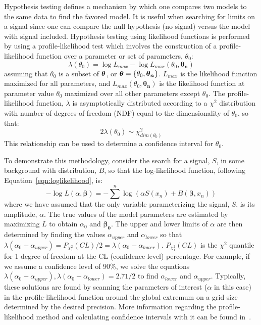 Hypothesis testing defines a mechanism by which one compares two models to the same data to find the favored model.  It is useful when searching for limits on a signal since one can compare the null hypothesis (no signal) versus the model with signal included.  Hypothesis testing using likelihood functions is performed by using a profile-likelihood test which involves the construction of a profile-likelihood function over a parameter or set of parameters, $\theta_{0}$:
		\begin{equation}
		\lambda(\theta_{0}) = \log L_{max}  - \log L_{max}(\theta_{0}, \boldsymbol{\theta_{n}})
		\end{equation}
assuming that $\theta_{0}$ is a subset of $\boldsymbol{\theta}$, or $\boldsymbol{\theta} = \{\theta_{0}, \boldsymbol{\theta_{n}}\}$.  $L_{max}$ is the likelihood function maximized for all parameters, and $ L_{max}(\theta_{0}, \boldsymbol{\theta_{n}})$ is the likelihood function at parameter value $\theta_{0}$ maximized over all other parameters except $\theta_{0}$.  The profile-likelihood function, $\lambda$ is asymptotically distributed according to a $\chi^{2}$ distribution with number-of-degrees-of-freedom (NDF) equal to the dimensionality of $\theta_{0}$, so that:
		\begin{equation}
		2 \lambda (\theta_{0}) \sim \chi^{2}_{dim(\theta_{0})}
		\end{equation}
  This relationship can be used to determine a confidence interval for $\theta_{0}$.		

To demonstrate this methodology, consider the search for a signal, $S$, in some background with distribution, $B$, so that the log-likelihood function, following Equation~\ref{eqn:loglikelihood}, is:
		\begin{equation}
		-\log L (\alpha, \boldsymbol{\beta}) = -\sum^{n} \log (\alpha S (x_{n}) + B(\boldsymbol{\beta}, x_{n}))
		\end{equation}
where we have assumed that the only variable parameterizing the signal, $S$, is its amplitude, $\alpha$.  The true values of the model parameters are estimated by maximizing $L$ to obtain $\alpha_{0}$ and $\boldsymbol{\beta_{0}}$.  The upper and lower limits of $\alpha$ are then determined by finding the values $\alpha_{upper}$ and $\alpha_{lower}$ so that $\lambda(\alpha_{0} + \alpha_{upper}) =  P_{\chi^{2}_{1}} (CL)/2 = \lambda(\alpha_{0} - \alpha_{lower})$.  $P_{\chi^{2}_{1}} (CL)$ is the $\chi^{2}$ quantile for 1 degree-of-freedom at the CL (confidence level) percentage.  For example, if we assume a confidence level of 90\%, we solve the equations $\lambda(\alpha_{0} + \alpha_{upper}), \lambda(\alpha_{0} - \alpha_{lower}) = 2.71/2$ to find $\alpha_{lower}$ and $\alpha_{upper}$.  Typically, these solutions are found by scanning the parameters of interest  ($\alpha$ in this case) in the profile-likelihood function around the global extremum on a grid size determined by the desired precision.  More information regarding the profile-likelihood method and calculating confidence intervals with it can be found in~\cite{Venz1988}.

